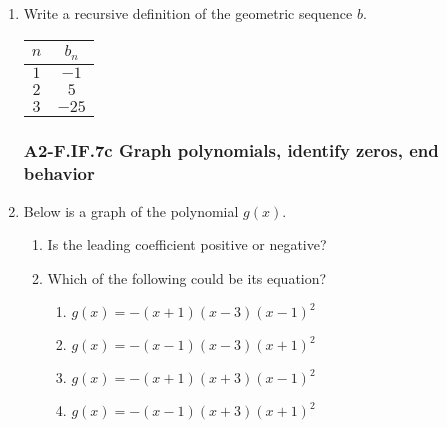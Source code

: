 \documentclass[12pt, twoside]{article}
\begin{document}
\begin{enumerate}[itemsep=0.5cm]
\item Write a recursive definition of the geometric sequence $b$. \\[0.5cm]
\renewcommand{\arraystretch}{1.5}
\begin{tabular}{|c|c|}
\hline
$n$ & $b_n$ \\
\hline
$1$ & $-1$ \\
$2$ & $5$ \\
$3$ & $-25$ \\
\hline
\end{tabular} \vspace{1cm}

\newpage 
\subsubsection*{A2-F.IF.7c Graph polynomials, identify zeros, end behavior}
\item Below is a graph of the polynomial $g(x)$. 
\begin{multicols}{2}
    \begin{enumerate}[itemsep=1cm]
        \item Is the leading coefficient positive or negative?
        \item Which of the following could be its equation?
        \begin{enumerate}
            \item $g(x) = -(x+1)(x-3)(x-1)^2$
            \item $g(x) = -(x-1)(x-3)(x+1)^2$
            \item $g(x) = -(x+1)(x+3)(x-1)^2$
            \item $g(x) = -(x-1)(x+3)(x+1)^2$
        \end{enumerate} \vspace{1cm} \;
    \end{enumerate}

    \columnbreak
\end{multicols}


\end{enumerate}
\end{document}
